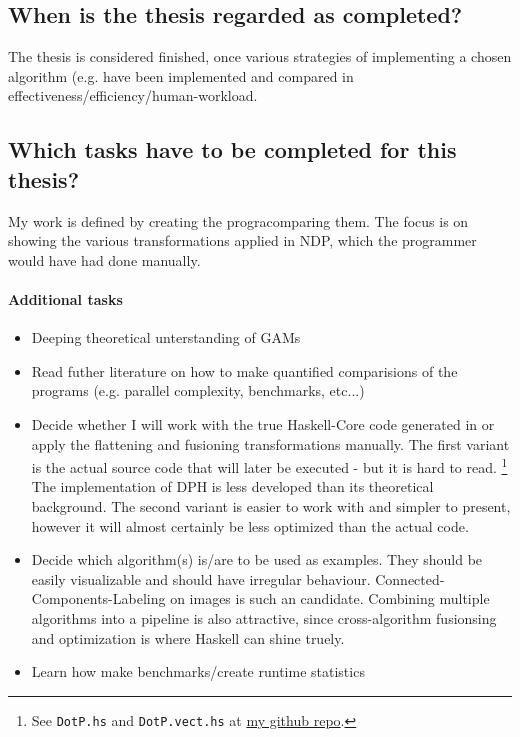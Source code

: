 \documentclass{article}
\begin{document}
    \subsection{When is the thesis regarded as completed?}
    The thesis is considered finished, once various strategies of
    implementing a chosen algorithm (e.g.  have been
    implemented and compared in effectiveness/efficiency/human-workload.

    \subsection{Which tasks have to be completed for this thesis?}
    My work is defined by creating the progracomparing them.
    The focus is on showing the various transformations applied in NDP, which the programmer would have had done manually.













    \paragraph{Additional tasks}
        \begin{itemize}
            \item Deeping theoretical unterstanding of GAMs
            \item Read futher literature on how to make quantified comparisions of the programs (e.g. parallel complexity, benchmarks, etc...)
            \item Decide whether I will work with the true Haskell-Core code generated in    or apply the flattening and fusioning transformations manually.
                The first variant is the actual source code that will later be executed - but it is hard to read. \footnote[1]{See \texttt{DotP.hs} and \texttt{DotP.vect.hs} at \href{https://github.com/GollyTicker/Nested-Data-Parallel-Haskell/tree/0e8d3df0d8084a01b007b27debda2b64247a254d}{my github repo}. }
                The implementation of DPH is less developed than its theoretical background.
                The second variant is easier to work with and simpler to present, however it will almost certainly be less optimized than the actual code.
            \item Decide which algorithm(s) is/are to be used as examples. They should be easily visualizable and should have irregular behaviour.
                Connected-Components-Labeling on images is such an candidate. Combining multiple algorithms into
                a pipeline is also attractive, since cross-algorithm fusionsing and optimization is where Haskell can shine truely.
            \item Learn how make benchmarks/create runtime statistics
        \end{itemize}
\end{document}
